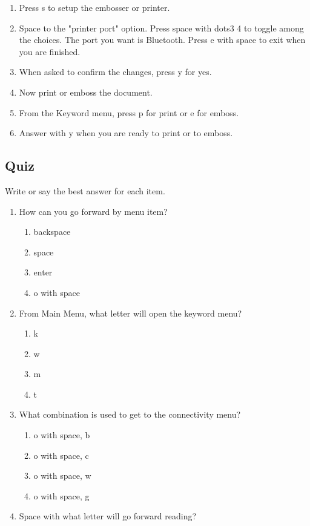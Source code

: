 \documentclass[10pt,letterpaper,twoside]{report}
\begin{document}
{{{\begin{enumerate}
	\item Press s to setup the embosser or printer.
	\item Space to the "printer port" option.  Press space with dots3 4 to toggle among the choices.  The port you want is Bluetooth.  Press e with space to exit when you are finished.
	\item When asked to confirm the changes, press y for yes.
	\item Now print or emboss the document.
	\item From the Keyword menu, press p for print or e for emboss.
	\item Answer with y when you are ready to print or to emboss.
\end{enumerate}
\clearpage

\subsection{Quiz}
Write or say the best answer for each item.
\begin{enumerate}
	\item How can you go forward by menu item?
	      \begin{enumerate}
		      \item backspace
		      \item space
		      \item enter
		      \item o with space
	      \end{enumerate}
	\item From Main Menu, what letter will open the keyword menu?
	      \begin{enumerate}
		      \item k
		      \item w
		      \item m
		      \item t
	      \end{enumerate}
	\item What combination is used to get to the connectivity menu?
	      \begin{enumerate}
		      \item o with space, b
		      \item o with space, c
		      \item o with space, w
		      \item o with space, g
	      \end{enumerate}
	\item Space with what letter will go forward reading?

\end{enumerate}}}}
\end{document}
